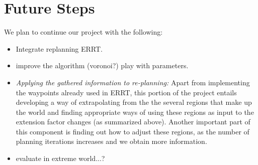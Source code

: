 \documentclass[11pt,twoside,twocolumn]{article}
\begin{document}
\section{Future Steps}

We plan to continue our project with the following:
\begin{itemize}
\item Integrate replanning ERRT.
\item improve the algorithm (voronoi?) play with parameters.
\item {\it Applying the gathered information to re-planning:} Apart from implementing the waypoints already used in ERRT, this portion of the project entails developing a way of extrapolating from the the several regions that make up the world and finding appropriate ways of using these regions as input to the extension factor changes (as summarized above). Another important part of this component is finding out how to adjust these regions, as the number of planning iterations increases and we obtain more information.
\item evaluate in extreme world...?
\end{itemize}

{}

\end{document}
